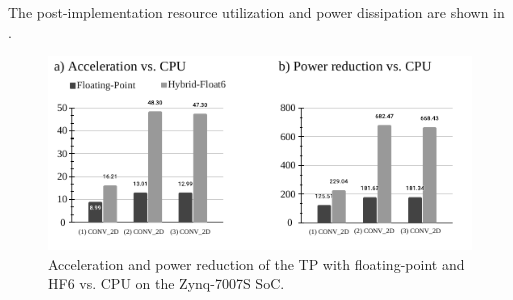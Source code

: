 The post-implementation resource utilization and power dissipation are shown in .

\begin{figure}[t!]
	\centering
	\includegraphics[width=1\columnwidth]{../figures/power_breakdown/acceleration_power_reduction.pdf}
	\caption{Acceleration and power reduction of the TP with floating-point and HF6 vs. CPU on the Zynq-7007S SoC.}
	\label{fig:ACCELERATION}
\end{figure}

